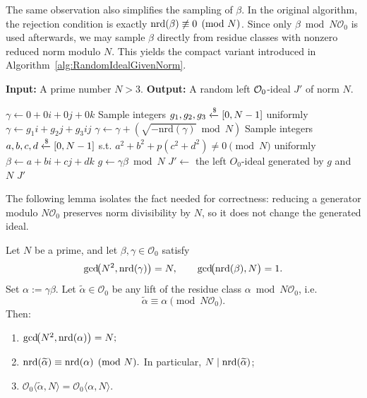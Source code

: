 The same observation also simplifies the sampling of $\beta$.
In the original algorithm, the rejection condition is exactly $\mathrm{nrd}(\beta)\not\equiv 0 \pmod N$.
Since only $\beta \bmod N\mathcal O_0$ is used afterwards, we may sample $\beta$ directly from residue classes with nonzero reduced norm modulo $N$.
This yields the compact variant introduced in Algorithm~\ref{alg:RandomIdealGivenNorm}.

\begin{algorithm}
\caption{RandomIdealGivenPrimeNorm($N$)}
\label{alg:RandomIdealGivenNorm}
\begin{algorithmic}[1]
\Statex \textbf{Input:} A prime number $N > 3$.
\Statex \textbf{Output:} A random left $\mathcal{O}_0$-ideal $J'$ of norm $N$.

\State $\gamma \gets 0+0i+0j+0k$
    \State Sample integers $g_1,g_2,g_3 \xleftarrow{\$} [0, N-1]$ uniformly
    \State $\gamma \gets g_1 i + g_2 j + g_3 ij$
        \State $\gamma \gets \gamma + \left(\sqrt{-\mathrm{nrd}(\gamma)} \bmod N\right)$
        \EndIf
    \EndWhile
\State Sample integers $a,b,c,d \xleftarrow{\$} [0,N-1]$ s.t. $a^2+b^2+p(c^2+d^2)\neq 0 \pmod N$ uniformly
\State $\beta \gets a+bi+cj+dk$
\State $g \gets \gamma\beta \bmod N$
\State $J' \gets$ the left $O_0$-ideal generated by $g$ and $N$
\State \Return $J'$
\end{algorithmic}
\end{algorithm}

The following lemma isolates the fact needed for correctness: reducing a generator modulo $N\mathcal O_0$ preserves norm divisibility by $N$, so it does not change the generated ideal.

\begin{lemma}
\label{lem:nrd-mod}
Let $N$ be a prime, and let $\beta,\gamma \in \mathcal O_0$ satisfy
\[
\gcd\!\bigl(N^2,\mathrm{nrd}(\gamma)\bigr)=N,
\qquad
\gcd\!\bigl(\mathrm{nrd}(\beta),N\bigr)=1.
\]
Set $\alpha := \gamma\beta$.
Let $\widetilde{\alpha}\in \mathcal O_0$ be any lift of the residue class
$\alpha \bmod N\mathcal O_0$, i.e.
\[
\widetilde{\alpha}\equiv \alpha \pmod{N\mathcal O_0}.
\]
Then:
\begin{enumerate}
    \item
    $
    \gcd\!\bigl(N^2,\mathrm{nrd}(\alpha)\bigr)=N;
    $
    \item
    $
    \mathrm{nrd}(\widetilde{\alpha})
    \equiv
    \mathrm{nrd}(\alpha)
    \pmod N.
    $
    In particular,
    $N \mid \mathrm{nrd}(\widetilde{\alpha})$;
    \item
    $\mathcal O_0\langle \widetilde{\alpha},N\rangle
    =
    \mathcal O_0\langle \alpha,N\rangle.$
\end{enumerate}
\end{lemma}

